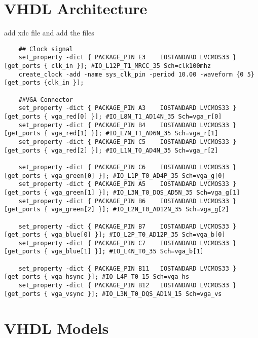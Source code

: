  \section{VHDL Architecture}
    add xdc file and add the files 
    \begin{verbatim}
    ## Clock signal
    set_property -dict { PACKAGE_PIN E3    IOSTANDARD LVCMOS33 } [get_ports { clk_in }]; #IO_L12P_T1_MRCC_35 Sch=clk100mhz
    create_clock -add -name sys_clk_pin -period 10.00 -waveform {0 5} [get_ports {clk_in }];
            
    ##VGA Connector            
    set_property -dict { PACKAGE_PIN A3    IOSTANDARD LVCMOS33 } [get_ports { vga_red[0] }]; #IO_L8N_T1_AD14N_35 Sch=vga_r[0]
    set_property -dict { PACKAGE_PIN B4    IOSTANDARD LVCMOS33 } [get_ports { vga_red[1] }]; #IO_L7N_T1_AD6N_35 Sch=vga_r[1]
    set_property -dict { PACKAGE_PIN C5    IOSTANDARD LVCMOS33 } [get_ports { vga_red[2] }]; #IO_L1N_T0_AD4N_35 Sch=vga_r[2]
            
    set_property -dict { PACKAGE_PIN C6    IOSTANDARD LVCMOS33 } [get_ports { vga_green[0] }]; #IO_L1P_T0_AD4P_35 Sch=vga_g[0]
    set_property -dict { PACKAGE_PIN A5    IOSTANDARD LVCMOS33 } [get_ports { vga_green[1] }]; #IO_L3N_T0_DQS_AD5N_35 Sch=vga_g[1]
    set_property -dict { PACKAGE_PIN B6    IOSTANDARD LVCMOS33 } [get_ports { vga_green[2] }]; #IO_L2N_T0_AD12N_35 Sch=vga_g[2]
    
    set_property -dict { PACKAGE_PIN B7    IOSTANDARD LVCMOS33 } [get_ports { vga_blue[0] }]; #IO_L2P_T0_AD12P_35 Sch=vga_b[0]
    set_property -dict { PACKAGE_PIN C7    IOSTANDARD LVCMOS33 } [get_ports { vga_blue[1] }]; #IO_L4N_T0_35 Sch=vga_b[1]
            
    set_property -dict { PACKAGE_PIN B11   IOSTANDARD LVCMOS33 } [get_ports { vga_hsync }]; #IO_L4P_T0_15 Sch=vga_hs
    set_property -dict { PACKAGE_PIN B12   IOSTANDARD LVCMOS33 } [get_ports { vga_vsync }]; #IO_L3N_T0_DQS_AD1N_15 Sch=vga_vs
    \end{verbatim}
 \section{VHDL Models}
 
